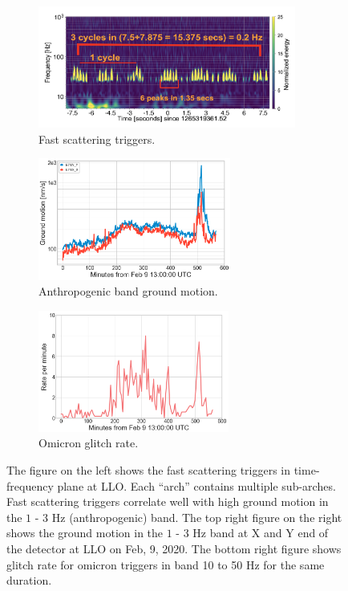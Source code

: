 \documentclass[12pt]{iopart}
\begin{document}
\begin{figure}
\captionsetup[subfigure]{font=scriptsize,labelfont=scriptsize}
   \begin{minipage}{0.5\textwidth}
   \begin{subfigure}[b]{\textwidth}
        \centering
         \includegraphics[width=\textwidth,height=4cm]{fast_scat11.png}
         \caption{Fast scattering triggers.}
         \label{fig:fastscat}
    \end{subfigure}
    \end{minipage}
    \begin{minipage}{0.5\textwidth}
    \begin{subfigure}{\textwidth}
    \includegraphics[width=\textwidth,height=4cm]{anthro_motion1.png}
    \caption{Anthropogenic band ground motion.} \label{subfig:anthro}
    \end{subfigure}

    \vspace*{0.6cm}
    \begin{subfigure}{\textwidth}
    \includegraphics[width=\textwidth,height=4cm]{fast_glitchrate1.png}
    \caption{Omicron glitch rate.} \label{subfig:fast_scat_rate}
    \end{subfigure}
    \end{minipage}
    \caption{The figure on the left shows the fast scattering triggers in time-frequency plane at LLO. Each ``arch'' contains multiple sub-arches. Fast scattering triggers correlate well with high ground motion in the $1$ - $3$ Hz (anthropogenic) band. The top right figure on the right shows the ground motion in the $1$ - $3$ Hz band at X and Y end of the detector at LLO on Feb, 9, 2020. The bottom right figure shows glitch rate for omicron triggers in band 10 to 50 Hz for the same duration. }
    \label{fig:Fast_scattering}

\end{figure}
\end{document}

